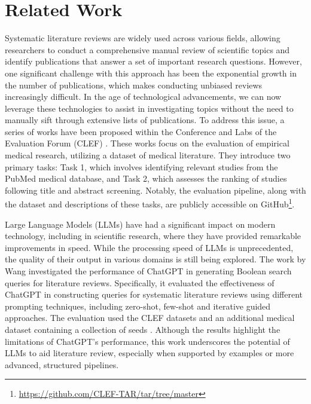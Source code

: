 \section{Related Work}\label{sec:relwork}

Systematic literature reviews are widely used across various fields, allowing researchers to conduct a comprehensive manual review of scientific topics and identify publications that answer a set of important research questions. However, one significant challenge with this approach has been the exponential growth in the number of publications, which makes conducting unbiased reviews increasingly difficult. In the age of technological advancements, we can now leverage these technologies to assist in investigating topics without the need to manually sift through extensive lists of publications. To address this issue, a series of works have been proposed within the Conference and Labs of the Evaluation Forum (CLEF) \autocite{kanoulas2017clef, kanoulas2018clef, kanoulas2019clef}. These works focus on the evaluation of empirical medical research, utilizing a dataset of medical literature. They introduce two primary tasks: Task 1, which involves identifying relevant studies from the PubMed medical database, and Task 2, which assesses the ranking of studies following title and abstract screening. Notably, the evaluation pipeline, along with the dataset and descriptions of these tasks, are publicly accessible on GitHub\footnote{\url{https://github.com/CLEF-TAR/tar/tree/master}}.

Large Language Models (LLMs) have had a significant impact on modern technology, including in scientific research, where they have provided remarkable improvements in speed. While the processing speed of LLMs is unprecedented, the quality of their output in various domains is still being explored. The work by Wang \autocite{wang2023can} investigated the performance of ChatGPT in generating Boolean search queries for literature reviews. Specifically, it evaluated the effectiveness of ChatGPT in constructing queries for systematic literature reviews using different prompting techniques, including zero-shot, few-shot and iterative guided approaches. The evaluation used the CLEF datasets \autocite{kanoulas2017clef, kanoulas2018clef, kanoulas2019clef} and an additional medical dataset containing a collection of seeds \autocite{Wang_2022}. Although the results highlight the limitations of ChatGPT's performance, this work underscores the potential of LLMs to aid literature review, especially when supported by examples or more advanced, structured pipelines.

